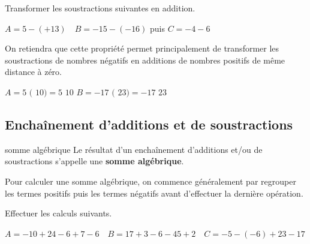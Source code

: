 \documentclass[a4paper]{book}
\begin{document}
    \begin{exemple}
        Transformer les soustractions suivantes en addition.
        
        $A = 5 - (+13) \quad B = -15 - (-16)$ puis $C = - 4 - 6$
    \end{exemple}

    \begin{methode}
        On retiendra que cette propriété permet principalement de transformer les soustractions de nombres négatifs en additions de nombres positifs de même distance à zéro.

        \setlength{\fboxsep}{0.7ex}
        $A= 5$ \fbox{-} $\big( $ \fbox{-} $10\big)=5 $ \fbox{+} $ 10$ \quad $B= -17$ \fbox{-} $\big( $ \fbox{-} $23\big)=-17 $ \fbox{+} $ 23$ \quad 
    \end{methode}


\subsection{Enchaînement d'additions et de soustractions}
    
    \begin{definitionTitre}{somme algébrique}
        Le résultat d'un enchaînement d’additions et/ou de soustractions s'appelle une \textbf{somme algébrique}.
    \end{definitionTitre}

    \begin{methode}
        Pour calculer une somme algébrique, on commence généralement par regrouper les termes positifs puis les termes négatifs avant d'effectuer la dernière opération.
    \end{methode}

    \begin{exemple}
        Effectuer les calculs suivants.

        $A=-10+24-6+7-6 \quad B=17+3-6-45+2 \quad C=-5-(-6)+23-17$
    \end{exemple}
\end{document}
